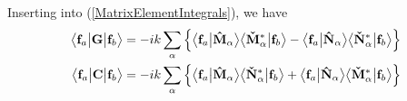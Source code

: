 \documentclass[letterpaper]{article}
\begin{document}
Inserting into (\ref{MatrixElementIntegrals}), we have 
\begin{align*}
 \big\langle \mathbf{f}_a \big| \mathbf{G} \big| \mathbf{f}_b \big\rangle
&=-ik\sum_{\alpha} 
    \Big\{  \big\langle \mathbf{f}_a \big| \mathbf{\hat M}_\alpha \big\rangle
            \big\langle \mathbf{\mathbf{\check M}}^*_\alpha \big| \mathbf{f}_b \big\rangle
           -\big\langle \mathbf{f}_a \big| \mathbf{\hat N}_\alpha \big\rangle
            \big\langle \mathbf{\mathbf{\check N}}^*_\alpha \big| \mathbf{f}_b \big\rangle
    \Big\}\\
 \big\langle \mathbf{f}_a \big| \mathbf{C} \big| \mathbf{f}_b \big\rangle
&=-ik\sum_{\alpha} 
    \Big\{  \big\langle \mathbf{f}_a \big| \mathbf{\hat M}_\alpha \big\rangle
            \big\langle \mathbf{\mathbf{\check N}}^*_\alpha \big| \mathbf{f}_b \big\rangle
           +\big\langle \mathbf{f}_a \big| \mathbf{\hat N}_\alpha \big\rangle
            \big\langle \mathbf{\mathbf{\check M}}^*_\alpha \big| \mathbf{f}_b \big\rangle
    \Big\}
\end{align*}
\end{document}
